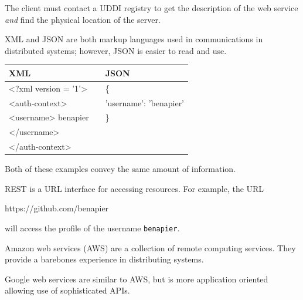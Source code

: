 The client must contact a UDDI registry to get the description of
the web service \emph{and} find the physical location of the server.

XML and JSON are both markup languages used in communications in
distributed systems; however,
JSON is easier to read and use.

\begin{example}
    \hfill
    \begin{center}
        \ttfamily
        \begin{tabular}{lp{1em}l}
            \toprule
            XML && JSON \\
            \midrule
            <?xml version = '1'> && 
            \{ \\
            <auth-context> && \hspace{1em} 
            'username': 'benapier'
            \\
            \hspace{1em} <username> benapier &&
            \} \\
            \hspace{1em} </username> \\
            </auth-context> \\
            \bottomrule
        \end{tabular}
    \end{center}
    Both of these examples convey the same amount of information.
\end{example}

\begin{example}
    REST is a URL interface for accessing resources.
    For example, the URL
    \begin{center}
        \ttfamily
        https://github.com/benapier
    \end{center}
    will access the profile of the username \texttt{benapier}.
\end{example}

\begin{example}[AWS]
    Amazon web services (AWS) are a collection of remote computing services.
    They provide a barebones experience in distributing systems.
\end{example}

\begin{example}[Google WS]
    Google web services are similar to AWS, but is more application oriented
    allowing use of sophisticated APIs.
\end{example}
